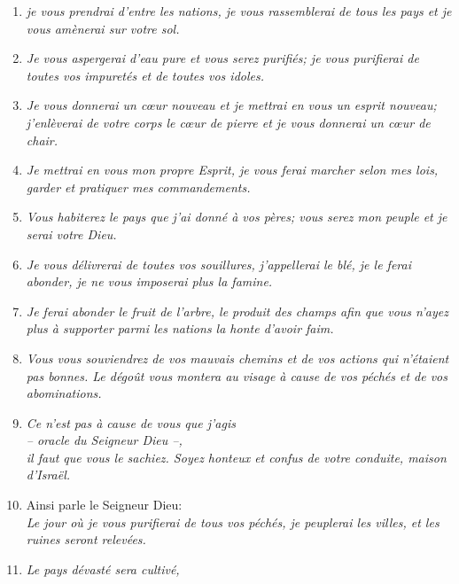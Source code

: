 \begin{enumerate}[leftmargin=\psleftmargin, labelsep = \pslabelsep, label={\arabic*}, font=\color{\pscolor}\small\textsuperscript, parsep=0em, itemsep=0em, topsep=0em ]
  \item {}\textit{je vous prendrai d’entre les nations, \brk
          je vous rassemblerai de tous les pays \brk
          et je vous amènerai sur votre sol.}
  \item {}\textit{Je vous aspergerai d’eau pure et vous serez purifiés; \brk
          je vous purifierai de toutes vos impuretés et de toutes vos idoles.}
        \newpage
  \item {}\textit{Je vous donnerai un cœur nouveau \brk
          et je mettrai en vous un esprit nouveau; \brk
          j’enlèverai de votre corps le cœur de pierre \brk
          et je vous donnerai un cœur de chair.}
  \item {}\textit{Je mettrai en vous mon propre Esprit, \brk
          je vous ferai marcher selon mes lois, \brk
          garder et pratiquer mes commandements.}
  \item {}\textit{Vous habiterez le pays que j’ai donné à vos pères; \brk
          vous serez mon peuple et je serai votre Dieu.}
  \item {}\textit{Je vous délivrerai de toutes vos souillures, \brk
          j’appellerai le blé, je le ferai abonder, \brk
          je ne vous imposerai plus la famine.}
  \item {}\textit{Je ferai abonder le fruit de l’arbre, le produit des champs \brk
          afin que vous n’ayez plus à supporter parmi les nations la honte d’avoir faim.}
  \item {}\textit{Vous vous souviendrez de vos mauvais chemins \brk
          et de vos actions qui n’étaient pas bonnes. \brk
          Le dégoût vous montera au visage \brk
          à cause de vos péchés et de vos abominations.}
  \item {}\textit{Ce n’est pas à cause de vous que j’agis \\
          – oracle du Seigneur Dieu –, \\
          il faut que vous le sachiez. \brk
          Soyez honteux et confus de votre conduite, maison d’Israël.} \parSpace
  \item {}Ainsi parle le Seigneur Dieu: \\
        \textit{Le jour où je vous purifierai de tous vos péchés, \brk
          je peuplerai les villes, et les ruines seront relevées.}
  \item {}\textit{Le pays dévasté sera cultivé, \brk
}
\end{enumerate}
